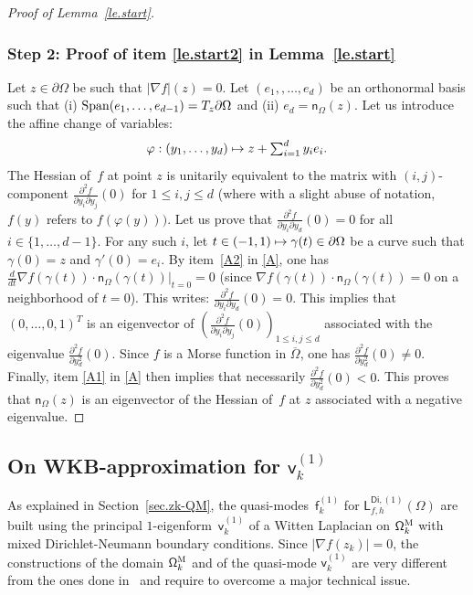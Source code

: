 \documentclass[JEP,XML,SOM,Unicode,NoEqCountersInSection,NoFloatCountersInSection,published]{cedram}
\let\ts\textstyle
\newcommand\mto{\mathchoice{\longmapsto}{\mapsto}{\mapsto}{\mapsto}}
\theoremstyle{plain}
\theoremstyle{definition}
\begin{document}
\begin{proof}[Proof of Lemma~\ref{le.start}]
\subsubsection*{Step 2: Proof of item \eqref{le.start2} in Lemma~\ref{le.start}}
Let $z\in \partial \Omega$ be such that $\vert \nabla f\vert (z)=0$.
Let $(e_1,, \ldots,e_d)$ be an orthonormal basis such that (i) $ {\rm
Span}(e_1, \ldots, e_{d-1}) = T_z \partial \Omega$ and (ii) $e_d = \mathsf n_\Omega(z)$.
Let us introduce the affine change of variables:
\[\ts
\varphi: (y_1,\ldots,y_d) \mto z + \sum_{i=1}^d y_i e_i.
\]
The Hessian of~$f$ at point $z$
is unitarily equivalent to the matrix with $(i,j)$-component
$\frac{\partial^2 f}{\partial y_i \partial y_j}(0)$ for $1 \le i,j
\le d$ (where with a slight abuse of notation, $f(y)$ refers to $f
(\varphi(y)))$. Let us prove that
$\frac{\partial^2 f}{\partial y_i
\partial y_d}(0)=0$ for all $i \in \{1, \ldots, d-1\}$. For any such $i$,
let $t \in (-1,1) \mto \gamma(t) \in \partial \Omega$ be a
curve such that $\gamma(0)=z$ and $\gamma'(0)=e_i$. By item~\eqref{A2} in \ref{A}, one has
$\frac{d}{dt} \nabla f(\gamma(t)) \cdot \mathsf n_{\Omega}(\gamma(t)) \big|_{t=0} = 0$ (since $\nabla f(\gamma(t)) \cdot
\mathsf n_{\Omega}(\gamma(t))=0$ on a neighborhood of $t=0$). This writes:
$\frac{\partial^2 f}{\partial y_i \partial y_d}(0)=0$. This implies that
$(0,\ldots,0,1)^T$ is an eigenvector of $\left(\frac{\partial^2
f}{\partial y_i \partial y_j}(0)\right)_{1 \le i,j \le d}$ associated
with the eigenvalue $\frac{\partial^2 f}{\partial y_d^2}(0)$. Since $f$
is a Morse function in $\overline{\Omega}$, one has $\frac{\partial^2
f}{\partial y_d^2}(0)\neq 0$. Finally, item \eqref{A1} in \ref{A} then
implies that necessarily $\frac{\partial^2 f}{\partial y_d^2}(0) < 0$.
This proves that $\mathsf n_\Omega(z)$ is an eigenvector of the Hessian of~$f$ at $z$ associated with a negative eigenvalue. \end{proof}

\subsection{On WKB-approximation for $ \mathsf v_k^{(1)}$}\label{sec:WKB}

As explained in Section~\ref{sec.zk-QM}, the quasi-modes~$\mathsf f_k^{(1)}$
for $\mathsf L_{f,h}^{\mathsf{Di},(1)}(\Omega)$ are built using the
principal $1$-eigenform~$ \mathsf v_k^{(1)} $ of a Witten Laplacian on $\mathsf \Omega_k^{\textsc{M}}$ with
mixed Dirichlet-Neumann boundary conditions. Since $\vert \nabla f(z_k)\vert =0$, the constructions of the domain $\mathsf \Omega_k^{\textsc{M}}$ and of the quasi-mode $\mathsf v_k^{(1)} $ are very different from the ones done in~\cite{DLLN} and require to overcome a major technical issue.
\end{document}
